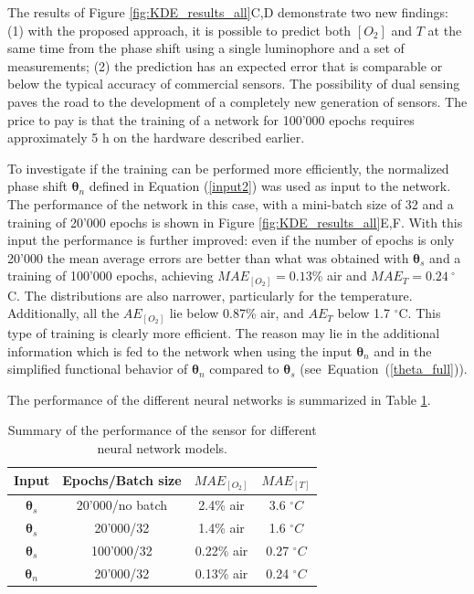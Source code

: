 \documentclass[sensors,article,accept,moreauthors,pdftex,10pt,a4paper]{Definitions/mdpi}
\theoremstyle{definition}
\begin{document}
The results of Figure \ref{fig:KDE_results_all}C,D demonstrate two new findings: (1) with the proposed approach, it is possible to predict both $[O_2]$ and $T$ at the same time from the phase shift using a single luminophore and a set of measurements; (2) the prediction has an expected error that is comparable or below the typical accuracy of commercial sensors. The possibility of dual sensing paves the road to the development of a completely new generation of sensors.
The price to pay is that the training of a network for 100'000 epochs requires approximately 5 h on the hardware described earlier.

To investigate if the training can be performed more efficiently, the normalized phase shift ${\pmb \theta}_n$ defined in Equation (\ref{input2}) was used as input to the network. The performance of the network in this case, with a mini-batch size of 32 and a training of 20'000 epochs is shown in Figure \ref{fig:KDE_results_all}E,F. With this input the performance is further improved: even if the number of epochs is only 20'000 the mean average errors are better than what was obtained with ${\pmb \theta}_s$ and a training of 100'000 epochs, achieving $MAE_{[O_2]}=0.13$\% air and $MAE_{T}=0.24 \ ^\circ$C. The distributions are also narrower, particularly for the temperature. Additionally, all the $AE_{[O_2]}$ lie below 0.87\% air, and  $AE_{T}$ below 1.7 $^\circ$C. This type of training is clearly more efficient. The reason may lie in the additional information which is fed to the network when using the input ${\pmb \theta}_n$ and in the simplified functional behavior of ${\pmb \theta}_n$ compared to ${\pmb \theta}_s$ (see~Equation~(\ref{theta_full})).


The performance of the different neural networks is summarized in Table \ref{TableMAE_summary}. 
\begin{table}[H]
\centering
\caption {Summary of the performance of the sensor for different neural network models.} %
\label{TableMAE_summary}
\begin{tabular}{ cccc}

\toprule
 \textbf{Input} & \textbf{Epochs/Batch size} & \boldmath$MAE_{[O_2]}$ & \boldmath$MAE_{[T]}$  \\ 
 \midrule
${\pmb \theta}_s$ & 20'000/\textrm{no batch} & 2.4\% air & 3.6 $^\circ C$\\ 
${\pmb \theta}_s$ & 20'000/32 & 1.4\% air & 1.6 $^\circ C$\\ 
${\pmb \theta}_s$& 100'000/32 & 0.22\% air & 0.27 $^\circ C$\\ 
${\pmb \theta}_n$ & 20'000/32 & 0.13\% air & 0.24 $^\circ C$\\ 
\bottomrule
\end{tabular}

\end{table}
\end{document}
